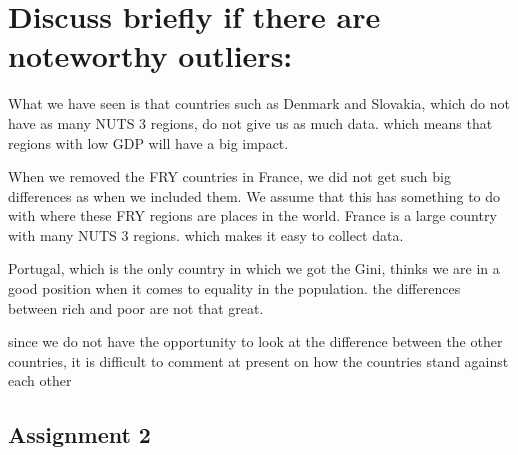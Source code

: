 \documentclass[
]{article}
\begin{document}
\hypertarget{discuss-briefly-if-there-are-noteworthy-outliers}{%
\section{Discuss briefly if there are noteworthy
outliers:}\label{discuss-briefly-if-there-are-noteworthy-outliers}}

What we have seen is that countries such as Denmark and Slovakia, which
do not have as many NUTS 3 regions, do not give us as much data. which
means that regions with low GDP will have a big impact.

When we removed the FRY countries in France, we did not get such big
differences as when we included them. We assume that this has something
to do with where these FRY regions are places in the world. France is a
large country with many NUTS 3 regions. which makes it easy to collect
data.

Portugal, which is the only country in which we got the Gini, thinks we
are in a good position when it comes to equality in the population. the
differences between rich and poor are not that great.

since we do not have the opportunity to look at the difference between
the other countries, it is difficult to comment at present on how the
countries stand against each other

\hypertarget{assignment-2}{%
\subsection{Assignment 2}\label{assignment-2}}
\end{document}
